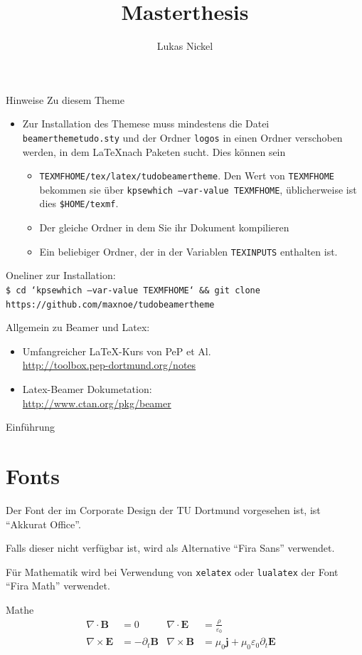 \documentclass[aspectratio=1610, 9pt]{beamer}
\title{Masterthesis}
\author[L.~Nickel]{Lukas Nickel}
\institute[E5b]{Experimentelle Physik 5b \\  Physik}
\begin{document}
\maketitle

\begin{frame}{Hinweise}
  Zu diesem Theme
  \begin{itemize}
    \item Zur Installation des Themese muss mindestens die Datei \texttt{beamerthemetudo.sty} und der Ordner \texttt{logos} in einen Ordner verschoben werden, in dem \LaTeX nach Paketen sucht.
      Dies können sein
      \begin{itemize}
        \item \texttt{TEXMFHOME/tex/latex/tudobeamertheme}. Den Wert von \texttt{TEXMFHOME} bekommen sie über \texttt{kpsewhich --var-value TEXMFHOME}, üblicherweise ist dies \texttt{\$HOME/texmf}.
        \item Der gleiche Ordner in dem Sie ihr Dokument kompilieren
        \item Ein beliebiger Ordner, der in der Variablen \texttt{TEXINPUTS} enthalten ist.
      \end{itemize}
  \end{itemize}
  
  Oneliner zur Installation:\\
  \texttt{\footnotesize\$ cd `kpsewhich --var-value TEXMFHOME` \&\& git clone https://github.com/maxnoe/tudobeamertheme}

  \medskip
  Allgemein zu Beamer und Latex:
  \begin{itemize}
    \item Umfangreicher \LaTeX-Kurs von PeP et Al. \\
      \url{http://toolbox.pep-dortmund.org/notes}
    \item Latex-Beamer Dokumetation:\\
    \url{http://www.ctan.org/pkg/beamer}
  \end{itemize}
\end{frame}

\begin{frame}{Einführung}
  \tableofcontents
\end{frame}

\section{Fonts}
\begin{frame}
  Der Font der im Corporate Design der TU Dortmund vorgesehen ist,
  ist \enquote{Akkurat Office}.

  Falls dieser nicht verfügbar ist, wird als Alternative \enquote{Fira Sans}
  verwendet.

  Für Mathematik wird bei Verwendung von \texttt{xelatex} oder \texttt{lualatex} der Font \enquote{Fira Math} verwendet.
\end{frame}

\begin{frame}{Mathe}
  \begin{align*}
    \nabla \cdot \symbf{B} &= 0 &
    \nabla \cdot \symbf{E} &= \frac{ρ}{ε_0} \\
    \nabla \times \symbf{E} &= -\partial_t \symbf{B} &
    \nabla \times \symbf{B} &= μ_0 \symbf{j} + μ_0 ε_0 \partial_t \symbf{E} &
  \end{align*}
\end{frame}
\end{document}
